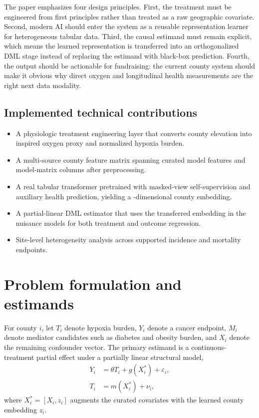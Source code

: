\documentclass[11pt]{article}
\begin{document}
The paper emphasizes four design principles. First, the treatment must be engineered from first principles rather than treated as a raw geographic covariate. Second, modern AI should enter the system as a reusable representation learner for heterogeneous tabular data. Third, the causal estimand must remain explicit, which means the learned representation is transferred into an orthogonalized DML stage instead of replacing the estimand with black-box prediction. Fourth, the output should be actionable for fundraising: the current county system should make it obvious why direct oxygen and longitudinal health measurements are the right next data modality.

\subsection{Implemented technical contributions}
\begin{itemize}[leftmargin=1.4em]
  \item A physiologic treatment engineering layer that converts county elevation into inspired oxygen proxy and normalized hypoxia burden.
  \item A multi-source county feature matrix spanning \ModelFeatures{} curated model features and \ModelMatrixFeatures{} model-matrix columns after preprocessing.
  \item A real tabular transformer pretrained with masked-view self-supervision and auxiliary health prediction, yielding a \FoundationEmbeddingDim{}-dimensional county embedding.
  \item A partial-linear DML estimator that uses the transferred embedding in the nuisance models for both treatment and outcome regression.
  \item Site-level heterogeneity analysis across supported incidence and mortality endpoints.
\end{itemize}

\section{Problem formulation and estimands}
For county $i$, let $T_i$ denote hypoxia burden, $Y_i$ denote a cancer endpoint, $M_i$ denote mediator candidates such as diabetes and obesity burden, and $X_i$ denote the remaining confounder vector. The primary estimand is a continuous-treatment partial effect under a partially linear structural model,
\begin{align}
Y_i &= \theta T_i + g(X_i^*) + \varepsilon_i, \\
T_i &= m(X_i^*) + \nu_i,
\end{align}
where $X_i^* = [X_i, z_i]$ augments the curated covariates with the learned county embedding $z_i$.
\end{document}
